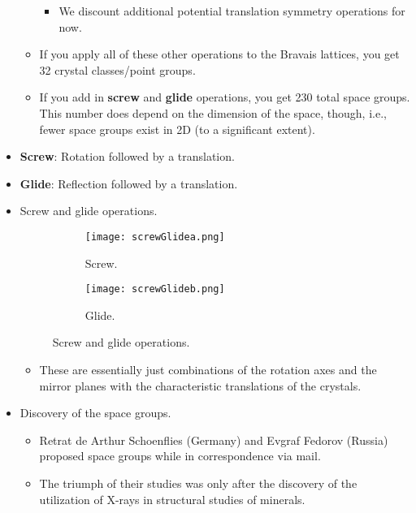 \documentclass[../notes.tex]{subfiles}
\begin{document}
\begin{itemize}
\begin{itemize}
        \begin{itemize}
            \item We discount additional potential translation symmetry operations for now.
        \end{itemize}
        \item If you apply all of these other operations to the Bravais lattices, you get 32 crystal classes/point groups.
        \item If you add in \textbf{screw} and \textbf{glide} operations, you get 230 total space groups. This number does depend on the dimension of the space, though, i.e., fewer space groups exist in 2D (to a significant extent).
    \end{itemize}
    \item \textbf{Screw}: Rotation followed by a translation.
    \item \textbf{Glide}: Reflection followed by a translation.
    \item Screw and glide operations.
    \begin{figure}[h!]
        \centering
        \begin{subfigure}[b]{0.35\linewidth}
            \centering
            \texttt{[image: screwGlidea.png]}
            \caption{Screw.}
            \label{fig:screwGlidea}
        \end{subfigure}
        \begin{subfigure}[b]{0.35\linewidth}
            \centering
            \texttt{[image: screwGlideb.png]}
            \caption{Glide.}
            \label{fig:screwGlideb}
        \end{subfigure}
        \caption{Screw and glide operations.}
        \label{fig:screwGlide}
    \end{figure}
    \begin{itemize}
        \item These are essentially just combinations of the rotation axes and the mirror planes with the characteristic translations of the crystals.
    \end{itemize}
    \item Discovery of the space groups.
    \begin{itemize}
        \item Retrat de Arthur Schoenflies (Germany) and Evgraf Fedorov (Russia) proposed space groups while in correspondence via mail.
        \item The triumph of their studies was only after the discovery of the utilization of X-rays in structural studies of minerals.

\end{itemize}
\end{itemize}
\end{document}
